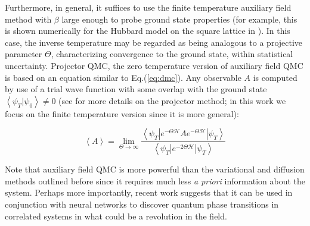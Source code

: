 Furthermore, in general, it suffices to use the finite temperature auxiliary field  method with $\beta$ large enough to probe ground state properties (for example, this is shown numerically for the Hubbard model on the square lattice in \cite{white_numerical_1989}).
In this case, the inverse temperature may be regarded as being analogous to a  projective parameter $\Theta$, characterizing convergence to the ground state, within statistical uncertainty.
Projector \ac{QMC}, the zero temperature version of auxiliary field \ac{QMC} is based on an equation similar to Eq.(\ref{eq:dmc}).
Any observable $A$ is computed by use of a trial wave function with some overlap with the ground state $\left\langle \psi_T | \psi_0 \right\rangle \neq 0$ (see \cite{f._assaad_quantum_2002} for more details on the projector method; in this work we focus on the finite temperature version since it is more general):

\begin{equation}
\left\langle A \right\rangle = \lim_{\Theta \rightarrow \infty} \frac{\left\langle \psi_T | e^{-\Theta \mathcal{H} } A e^{-\Theta \mathcal{H} } | \psi_T \right\rangle }{\left\langle \psi_T | e^{- 2 \Theta \mathcal{H} } | \psi_T \right\rangle}
\end{equation}

Note that auxiliary field \ac{QMC} is more powerful than the variational and diffusion methods outlined before since it requires much less \emph{a priori} information about the system.
Perhaps more importantly, recent work suggests that it can be used in conjunction with neural networks to discover quantum phase transitions in correlated systems  \cite{broecker_machine_2017} in what could be a revolution in the field.